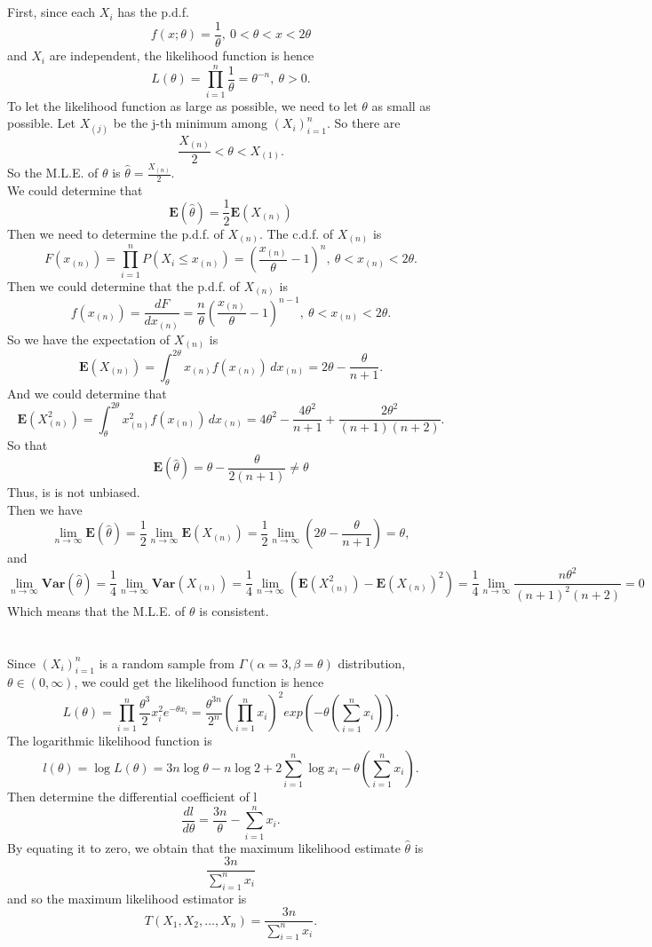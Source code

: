 \documentclass[10.5pt]{article}
\begin{document}
\subsection{}
First, since each $X_i$ has the p.d.f. $$f(x;\theta)=\frac{1}{\theta},~0<\theta<x<2\theta$$\indent
and $X_i$ are independent, the likelihood function is hence $$L(\theta)=\prod_{i=1}^n\frac{1}{\theta}=\theta^{-n},~\theta>0.$$\indent
To let the likelihood function as large as possible, we need to let $\theta$ as small as possible. Let $X_{(j)}$ be the j-th minimum among $(X_i)_{i=1}^n$. So there are $$\frac{X_{(n)}}{2}<\theta<X_{(1)}.$$\indent
So the M.L.E. of $\theta$ is $\hat{\theta}=\frac{X_{(n)}}{2}$.\\\indent
We could determine that $$\mathbf{E}(\hat{\theta})=\frac{1}{2}\mathbf{E}(X_{(n)})$$\indent
Then we need to determine the p.d.f. of $X_{(n)}$. The c.d.f. of $X_{(n)}$ is $$F(x_{(n)})=\prod_{i=1}^nP(X_i\leqslant x_{(n)})=\left(\frac{x_{(n)}}{\theta}-1\right)^n,~\theta<x_{(n)}<2\theta.$$\indent
Then we could determine that the p.d.f. of $X_{(n)}$ is $$f(x_{(n)})=\frac{d F}{dx_{(n)}}=\frac{n}{\theta}\left(\frac{x_{(n)}}{\theta}-1\right)^{n-1},~\theta<x_{(n)}<2\theta.$$\indent
So we have the expectation of $X_{(n)}$ is $$\mathbf{E}(X_{(n)})=\int_{\theta}^{2\theta}x_{(n)}f(x_{(n)})\,dx_{(n)}=2\theta-\frac{\theta}{n+1}.$$\indent
And we could determine that $$\mathbf{E}(X_{(n)}^2)=\int_{\theta}^{2\theta}x_{(n)}^2f(x_{(n)})\,dx_{(n)}=4\theta^2-\frac{4\theta^2}{n+1}+\frac{2\theta^2}{(n+1)(n+2)}.$$\indent
So that $$\mathbf{E}(\hat{\theta})=\theta-\frac{\theta}{2(n+1)}\neq\theta$$\indent
Thus, is is not unbiased.\\\indent
Then we have $$\lim_{n\to\infty}\mathbf{E}(\hat{\theta})=\frac{1}{2}\lim_{n\to\infty}\mathbf{E}(X_{(n)})=\frac{1}{2}\lim_{n\to\infty}\left(2\theta-\frac{\theta}{n+1}\right)=\theta,$$\indent
and $$\lim_{n\to\infty}\mathbf{Var}(\hat{\theta})=\frac{1}{4}\lim_{n\to\infty}\mathbf{Var}(X_{(n)})=\frac{1}{4}\lim_{n\to\infty}\left(\mathbf{E}(X_{(n)}^2)-\mathbf{E}(X_{(n)})^2\right)=\frac{1}{4}\lim_{n\to\infty}\frac{n\theta^2}{(n+1)^2(n+2)}=0$$\indent
Which means that the M.L.E. of $\theta$ is consistent.


\section{}
Since $(X_i)_{i=1}^n$ is a random sample from $\Gamma(\alpha=3,\beta=\theta)$ distribution, $\theta\in(0,\infty)$, we could get the likelihood function is hence $$L(\theta)=\prod_{i=1}^n\frac{\theta^3}{2}x_i^2e^{-\theta x_i}=\frac{\theta^{3n}}{2^n}(\prod_{i=1}^nx_i)^2exp(-\theta(\sum_{i=1}^nx_i)).$$\indent
The logarithmic likelihood function is $$l(\theta)=\log L(\theta)=3n\log\theta-n\log2+2\sum_{i=1}^n\log x_i-\theta(\sum_{i=1}^nx_i).$$\indent
Then determine the differential coefficient of l $$\frac{dl}{d\theta}=\frac{3n}{\theta}-\sum_{i=1}^nx_i.$$\indent
By equating it to zero, we obtain that the maximum likelihood estimate $\hat{\theta}$ is $$\frac{3n}{\sum_{i=1}^nx_i}$$\indent
and so the maximum likelihood estimator is $$T(X_1,X_2,\dots,X_n)=\frac{3n}{\sum_{i=1}^nx_i}.$$
\end{document}

